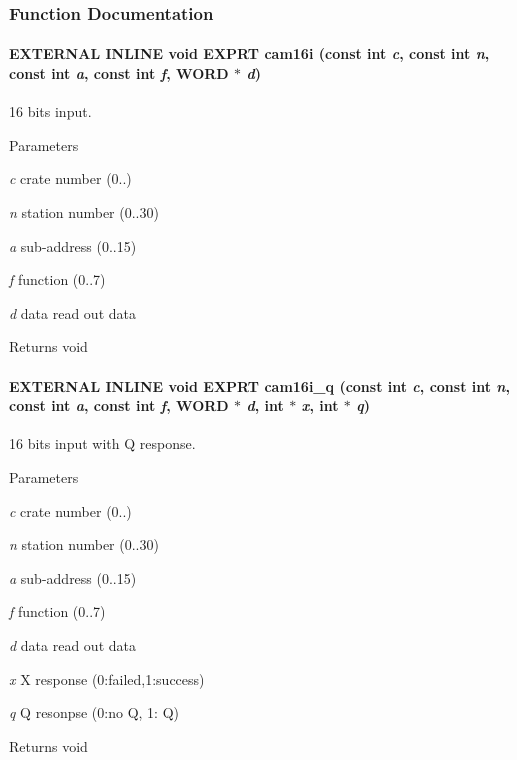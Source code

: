 \subsubsection{Function Documentation}
\paragraph[{cam16i}]{\setlength{\rightskip}{0pt plus 5cm}EXTERNAL INLINE void EXPRT cam16i (const int {\em c}, \/  const int {\em n}, \/  const int {\em a}, \/  const int {\em f}, \/  {\bf WORD} $\ast$ {\em d})}\hfill\label{group__mcstdfunctionh_gad17f339ee8254f1aad6b406e50ebd4a8}
16 bits input. 
\begin{DoxyParams}{Parameters}
\item[{\em c}]crate number (0..) \item[{\em n}]station number (0..30) \item[{\em a}]sub-\/address (0..15) \item[{\em f}]function (0..7) \item[{\em d}]data read out data \end{DoxyParams}
\begin{DoxyReturn}{Returns}
void 
\end{DoxyReturn}
\paragraph[{cam16i\_\-q}]{\setlength{\rightskip}{0pt plus 5cm}EXTERNAL INLINE void EXPRT cam16i\_\-q (const int {\em c}, \/  const int {\em n}, \/  const int {\em a}, \/  const int {\em f}, \/  {\bf WORD} $\ast$ {\em d}, \/  int $\ast$ {\em x}, \/  int $\ast$ {\em q})}\hfill\label{group__mcstdfunctionh_ga2a515796e8020af32ea0e5aad490a170}
16 bits input with Q response. 
\begin{DoxyParams}{Parameters}
\item[{\em c}]crate number (0..) \item[{\em n}]station number (0..30) \item[{\em a}]sub-\/address (0..15) \item[{\em f}]function (0..7) \item[{\em d}]data read out data \item[{\em x}]X response (0:failed,1:success) \item[{\em q}]Q resonpse (0:no Q, 1: Q) \end{DoxyParams}
\begin{DoxyReturn}{Returns}
void 
\end{DoxyReturn}


